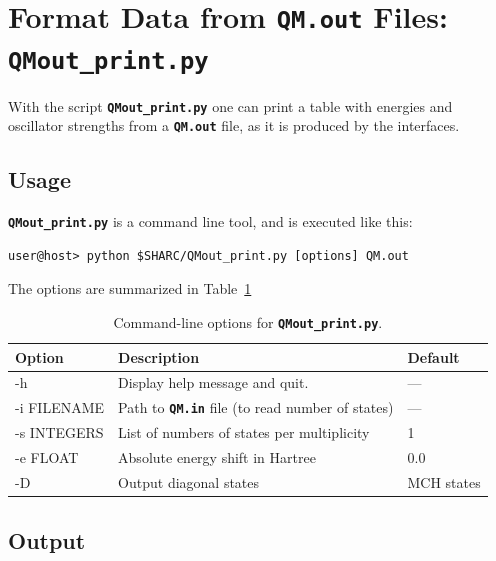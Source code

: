 \documentclass[a4paper,10pt,DIV=15,openany,twoside=false]{scrbook}
\newcommand{\ttt}[1]{\textbf{\texttt{#1}}}
\begin{document}

\section{Format Data from \ttt{QM.out} Files: \ttt{QMout\_print.py}}\label{sec:QMout_print.py}

With the script \ttt{QMout\_print.py} one can print a table with energies and oscillator strengths from a \ttt{QM.out} file, as it is produced by the interfaces.

\subsection{Usage}

\ttt{QMout\_print.py} is a command line tool, and is executed like this:
\begin{verbatim}
user@host> python $SHARC/QMout_print.py [options] QM.out
\end{verbatim}
The options are summarized in Table~\ref{tab:QMoutprint_options}

\begin{table}[htb]
  \centering
  \caption{Command-line options for \ttt{QMout\_print.py}. }
  \label{tab:QMoutprint_options}
  \begin{tabular}{>{\ttfamily}lll}
    \toprule
    \rmfamily Option         &Description    &Default\\
    \midrule
    -h          &Display help message and quit.         &---       \\
    -i FILENAME &Path to \ttt{QM.in} file (to read number of states)    &---\\
    -s INTEGERS &List of numbers of states per multiplicity             &1\\
    -e FLOAT    &Absolute energy shift in Hartree                       &0.0\\
    -D          &Output diagonal states                                 &MCH states\\
    \bottomrule
  \end{tabular}
\end{table}

\subsection{Output}
\end{document}
